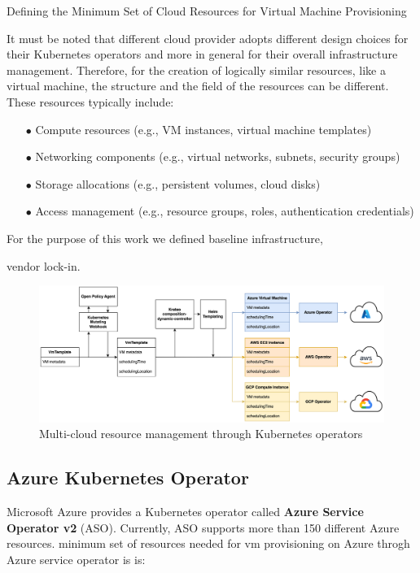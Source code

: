 Defining the Minimum Set of Cloud Resources for Virtual Machine Provisioning

It must be noted that different cloud provider adopts different design choices for their Kubernetes operators and more in general for their overall infrastructure management. Therefore, for the creation of logically similar resources, like a virtual machine, the structure and the field of the resources can be different. 
These resources typically include:
\begin{itemize}[itemsep=0.2pt, topsep=1pt]
  \item[$\bullet$] Compute resources (e.g., VM instances, virtual machine templates)
  \item[$\bullet$] Networking components (e.g., virtual networks, subnets, security groups)
  \item[$\bullet$] Storage allocations (e.g., persistent volumes, cloud disks)
  \item[$\bullet$] Access management (e.g., resource groups, roles, authentication credentials)
\end{itemize}


For the purpose of this work we defined baseline infrastructure, 

vendor lock-in.



\begin{figure}[htb]
\centering
\includegraphics[width=1\linewidth]{images/operators.png}
\caption{Multi-cloud resource management through Kubernetes operators}
\label{fig:operators}
\end{figure}

\newpage

\subsection{Azure Kubernetes Operator}

Microsoft Azure provides a Kubernetes operator called \textbf{Azure Service Operator v2} (ASO).
Currently, ASO supports more than 150 different Azure resources.
minimum set of resources needed for vm provisioning on Azure throgh Azure service operator is is:

